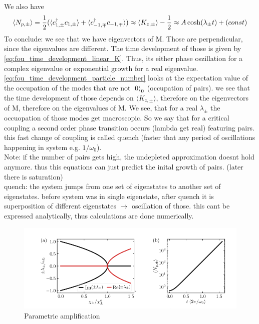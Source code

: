 We also have
\begin{equation}\label{eq:fou_time_development_particle_number}
	\langle N_{p,\pm} \rangle = \frac{1}{2} (\langle c_{1,\pm}^\dag c_{1,\pm} \rangle + \langle c_{-1,\mp}^\dag c_{-1,\mp}\rangle ) \approx \langle K_{z,\pm} \rangle - \frac{1}{2} \approx A\cosh(\lambda_\pm t) + \text(const)
\end{equation}
To conclude: we see that we have eigenvectors of M. Those are perpendicular, since the eigenvalues are different. The time development of those is given by \ref{eq:fou_time_development_linear_K}. Thus, its either phase oszillation for a complex eigenvalue or exponential growth for a real eigenvalue. \ref{eq:fou_time_development_particle_number} looks at the expectation value of the occupation of the modes that are not $\ket{0}_0$ (occupation of pairs). we see that the time development of those depends on $ \langle K_{z,\pm} \rangle$, therefore on the eigenvectors of M, therefore on the eigenvalues of M. We see, that for a real $\lambda_\pm$ the occuopation of those modes get macroscopic. So we say that for a critical coupling a second order phase transition occurs (lambda get real) featuring pairs. this fast change of coupling is called quench (faster that any period of oscillations happening in system e.g. $1/\omega_0$). 
\\
Note: if the number of pairs gets high, the undepleted approximation doesnt hold anymore. thus this equations can just predict the inital growth of pairs. (later there is saturation)
\\
quench: the system jumps from one set of eigenstates to another set of eigenstates. before system was in single eigenstate, after quench it is superposition of different eigenstates $\rightarrow$ oscillation of those. this cant be expressed analytically, thus calculations are done numerically. 
\begin{figure}[h!]
	\centering
	\includegraphics[width=1\linewidth]{Images/scetch_quench_parametric_amplification.png}
	\caption{Parametric amplification}
	\label{fig:scetch_quench_parametric_amplification}
\end{figure}

